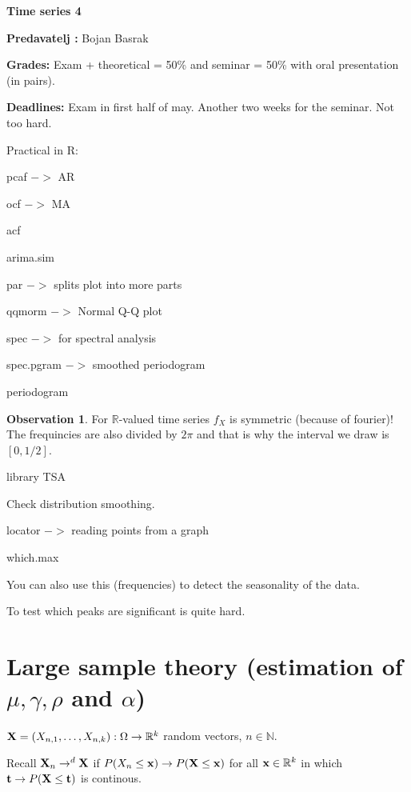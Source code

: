 \documentclass[12pt,a4paper]{amsart}
\theoremstyle{definition} %
\newtheorem{observation}[defn]{Observation}
\theoremstyle{plain} %
\newcommand{\R}{\mathbb R}
\newcommand{\N}{\mathbb N}
\begin{document}
{\bf \huge Time series 4}

\vskip1cm

{\bf Predavatelj : } Bojan Basrak


{\bf Grades: } Exam + theoretical = 50\% and seminar = 50\% with oral presentation (in pairs).

{\bf Deadlines: } Exam in first half of may. Another two weeks for the seminar. Not too hard.

Practical in R:

pcaf $->$ AR

ocf $->$ MA

acf

arima.sim

par $->$ splits plot into more parts

qqmorm $->$ Normal Q-Q plot

spec $->$ for spectral analysis

spec.pgram $->$ smoothed periodogram

periodogram

\begin{observation}
For $\R$-valued time series $f_X$ is symmetric (because of fourier)! The frequincies are also divided by $2 \pi$ and that is why the interval we draw is $[0, 1/2]$.
\end{observation}

library TSA

Check distribution smoothing. 

locator $->$ reading points from a graph

which.max

You can also use this (frequencies) to detect the seasonality of the data.

To test which peaks are significant is quite hard. 


\section{Large sample theory (estimation of $\mu, \gamma, \rho$ and $ \alpha$)}

\vskip1cm


${\bf X} = (X_{n, 1}, \dots, X_{n,k}) : \Omega \rightarrow \R^k$ random vectors, $n \in \N$.

Recall ${\bf X}_n \rightarrow^d {\bf X}$ if $P(X_n \leq {\bf x}) \rightarrow P({\bf X} \leq {\bf x})$ for all ${\bf x} \in \R^k$ in which ${\bf t} \rightarrow P({\bf X} \leq {\bf t})$ is continous. 
\end{document}
